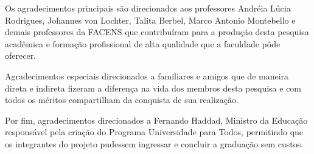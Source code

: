 \begin{agradecimentos}
    Os agradecimentos principais são direcionados aos professores Andréia Lúcia Rodrigues, Johannes von Lochter, 
    Talita Berbel, Marco Antonio Montebello e demais professores da FACENS que contribuíram para a produção desta pesquisa acadêmica e 
    formação profissional de alta qualidade que a faculdade pôde oferecer.

    Agradecimentos especiais direcionados a familiares e amigos que de maneira direta e indireta fizeram a diferença na vida dos 
    membros desta pesquisa e com todos os méritos compartilham da conquista de sua realização.
    
    Por fim, agradecimentos direcionados a Fernando Haddad, Ministro da Educação 
    responsável pela criação do Programa Universidade para Todos, permitindo que os integrantes do 
    projeto pudessem ingressar e concluir a graduação sem custos.
\end{agradecimentos}